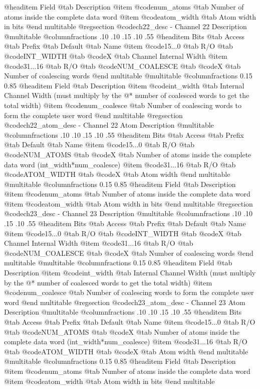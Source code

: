 @headitem Field @tab Description
@item @code{num_atoms} @tab Number of atoms inside the complete data word
@item @code{atom_width} @tab Atom width in bits
@end multitable
@regsection @code{ch22_desc} - Channel 22 Description
@multitable @columnfractions .10 .10 .15 .10 .55
@headitem Bits @tab Access @tab Prefix @tab Default @tab Name
@item @code{15...0}
@tab R/O @tab
@code{INT_WIDTH}
@tab @code{X} @tab 
Channel Internal Width
@item @code{31...16}
@tab R/O @tab
@code{NUM_COALESCE}
@tab @code{X} @tab 
Number of coalescing words
@end multitable
@multitable @columnfractions 0.15 0.85
@headitem Field @tab Description
@item @code{int_width} @tab Internal Channel Width (must multiply by the @* number of coalesced words to get the total width)
@item @code{num_coalesce} @tab Number of coalescing words to form the complete user word
@end multitable
@regsection @code{ch22_atom_desc} - Channel 22 Atom Description
@multitable @columnfractions .10 .10 .15 .10 .55
@headitem Bits @tab Access @tab Prefix @tab Default @tab Name
@item @code{15...0}
@tab R/O @tab
@code{NUM_ATOMS}
@tab @code{X} @tab 
Number of atoms inside the complete data word (int_width*num_coalesce)
@item @code{31...16}
@tab R/O @tab
@code{ATOM_WIDTH}
@tab @code{X} @tab 
Atom width
@end multitable
@multitable @columnfractions 0.15 0.85
@headitem Field @tab Description
@item @code{num_atoms} @tab Number of atoms inside the complete data word
@item @code{atom_width} @tab Atom width in bits
@end multitable
@regsection @code{ch23_desc} - Channel 23 Description
@multitable @columnfractions .10 .10 .15 .10 .55
@headitem Bits @tab Access @tab Prefix @tab Default @tab Name
@item @code{15...0}
@tab R/O @tab
@code{INT_WIDTH}
@tab @code{X} @tab 
Channel Internal Width
@item @code{31...16}
@tab R/O @tab
@code{NUM_COALESCE}
@tab @code{X} @tab 
Number of coalescing words
@end multitable
@multitable @columnfractions 0.15 0.85
@headitem Field @tab Description
@item @code{int_width} @tab Internal Channel Width (must multiply by the @* number of coalesced words to get the total width)
@item @code{num_coalesce} @tab Number of coalescing words to form the complete user word
@end multitable
@regsection @code{ch23_atom_desc} - Channel 23 Atom Description
@multitable @columnfractions .10 .10 .15 .10 .55
@headitem Bits @tab Access @tab Prefix @tab Default @tab Name
@item @code{15...0}
@tab R/O @tab
@code{NUM_ATOMS}
@tab @code{X} @tab 
Number of atoms inside the complete data word (int_width*num_coalesce)
@item @code{31...16}
@tab R/O @tab
@code{ATOM_WIDTH}
@tab @code{X} @tab 
Atom width
@end multitable
@multitable @columnfractions 0.15 0.85
@headitem Field @tab Description
@item @code{num_atoms} @tab Number of atoms inside the complete data word
@item @code{atom_width} @tab Atom width in bits
@end multitable
